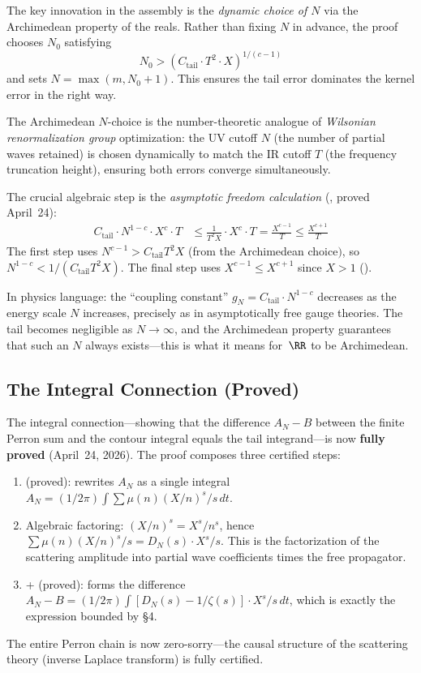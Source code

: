 The key innovation in the assembly is the \emph{dynamic choice of $N$}
via the Archimedean property of the reals. Rather than fixing $N$ in
advance, the proof chooses $N_0$ satisfying
\[
  N_0 > (C_{\mathrm{tail}} \cdot T^2 \cdot X)^{1/(c-1)}
\]
and sets $N = \max(m, N_0 + 1)$. This ensures the tail error dominates
the kernel error in the right way.

\begin{principle}
The Archimedean $N$-choice is the number-theoretic analogue of
\emph{Wilsonian renormalization group} optimization: the UV cutoff $N$
(the number of partial waves retained) is chosen dynamically to match
the IR cutoff $T$ (the frequency truncation height), ensuring both
errors converge simultaneously.

The crucial algebraic step is the \emph{asymptotic freedom calculation}
(, proved April~24):
\begin{align}
  C_{\mathrm{tail}} \cdot N^{1-c} \cdot X^c \cdot T
  &\leq \frac{1}{T^2 X} \cdot X^c \cdot T
  = \frac{X^{c-1}}{T}
  \leq \frac{X^{c+1}}{T}
\end{align}
The first step uses $N^{c-1} > C_{\mathrm{tail}} T^2 X$ (from the
Archimedean choice$)$, so $N^{1-c} < 1/(C_{\mathrm{tail}} T^2 X)$.
The final step uses $X^{c-1} \leq X^{c+1}$ since $X > 1$
().

In physics language: the ``coupling constant'' $g_N = C_{\mathrm{tail}} \cdot N^{1-c}$
decreases as the energy scale $N$ increases, precisely as in
asymptotically free gauge theories. The tail becomes negligible as
$N \to \infty$, and the Archimedean property guarantees that such an
$N$ always exists---this is what it means for~$\RR$ to be Archimedean.
\end{principle}

\subsection{The Integral Connection (Proved)}

The integral connection---showing that the difference $A_N - B$ between
the finite Perron sum and the contour integral equals the tail integrand---is
now \textbf{fully proved} (April~24, 2026). The proof composes three certified steps:
\begin{enumerate}
  \item {} (proved): rewrites $A_N$ as a
    single integral $A_N = (1/2\pi) \int \sum \mu(n)(X/n)^s/s\,dt$.
  \item Algebraic factoring: $(X/n)^s = X^s/n^s$, hence
    $\sum \mu(n)(X/n)^s/s = D_N(s) \cdot X^s/s$. This is the factorization
    of the scattering amplitude into partial wave coefficients times the
    free propagator.
  \item {} +  (proved): forms
    the difference $A_N - B = (1/2\pi)\int [D_N(s) - 1/\zeta(s)] \cdot X^s/s\,dt$,
    which is exactly the expression bounded by \S4.
\end{enumerate}
The entire Perron chain is now zero-sorry---the causal structure of the
scattering theory (inverse Laplace transform) is fully certified.


